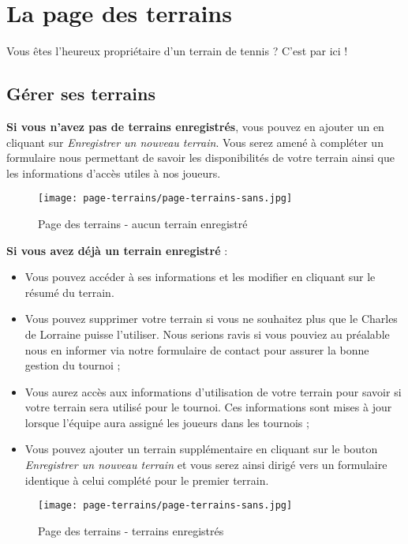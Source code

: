 \section{La page des terrains}

Vous êtes l'heureux propriétaire d'un terrain de tennis ? C'est par ici !

\subsection{Gérer ses terrains}

\textbf{Si vous n'avez pas de terrains enregistrés}, vous pouvez en ajouter un
en cliquant sur \textit{Enregistrer un nouveau terrain}. Vous serez amené à
compléter un formulaire nous permettant de savoir les disponibilités de votre
terrain ainsi que les informations d'accès utiles à nos joueurs.

\begin{figure}[H]
\centering
\texttt{[image: page-terrains/page-terrains-sans.jpg]}
\caption{Page des terrains - aucun terrain enregistré}
\end{figure}

\textbf{Si vous avez déjà un terrain enregistré} :

\begin{itemize}
    \item Vous pouvez accéder à ses informations et les modifier en cliquant
    sur le résumé du terrain.
    \item Vous pouvez supprimer votre terrain si vous ne souhaitez plus que
    le Charles de Lorraine puisse l'utiliser. Nous serions ravis si vous
    pouviez au préalable nous en informer via notre formulaire de contact pour
    assurer la bonne gestion du tournoi ;
    \item Vous aurez accès aux informations d'utilisation de votre terrain pour
    savoir si votre terrain sera utilisé pour le tournoi. Ces informations
    sont mises à jour lorsque l'équipe aura assigné les joueurs dans les
    tournois ;
    \item Vous pouvez ajouter un terrain supplémentaire en cliquant sur le
    bouton \textit{Enregistrer un nouveau terrain} et vous serez ainsi dirigé
    vers un formulaire identique à celui complété pour le premier terrain.
\end{itemize}

\begin{figure}[H]
\centering
\texttt{[image: page-terrains/page-terrains-sans.jpg]}
\caption{Page des terrains - terrains enregistrés}
\end{figure}
